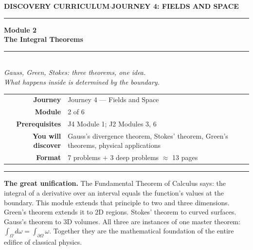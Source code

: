 \documentclass[12pt,a4paper]{article}
\newcounter{problem}
\begin{document}
\thispagestyle{empty}
\begin{center}
{\small\color{MidBlue}\textbf{DISCOVERY CURRICULUM}\quad$\cdot$\quad\textbf{JOURNEY 4: FIELDS AND SPACE}}
\vspace{0.6cm}

{\color{NavyBlue}\rule{\linewidth}{2pt}}\vspace{0.5cm}

{\Huge\bfseries\color{NavyBlue}Module 2}\\[0.3cm]
{\LARGE\bfseries\color{MidBlue}The Integral Theorems}\\[0.4cm]
{\color{Gold}\rule{0.4\linewidth}{1.2pt}}\\[0.4cm]
{\large\itshape\color{DarkGrey}
Gauss, Green, Stokes: three theorems, one idea.\\[0.15cm]
What happens inside is determined by the boundary.}

\vspace{1cm}
\begin{tabular}{rl}
\color{DarkGrey}\textbf{Journey}         & Journey 4 --- Fields and Space \\[4pt]
\color{DarkGrey}\textbf{Module}          & 2 of 6 \\[4pt]
\color{DarkGrey}\textbf{Prerequisites}   & J4 Module 1; J2 Modules 3, 6 \\[4pt]
\color{DarkGrey}\textbf{You will discover} & Gauss's divergence theorem, Stokes' theorem, Green's theorems, physical applications \\[4pt]
\color{DarkGrey}\textbf{Format}          & 7 problems $+$ 3 deep problems $\approx$ 13 pages \\
\end{tabular}
\vspace{1cm}

{\color{NavyBlue}\rule{\linewidth}{2pt}}
\end{center}

\vspace{0.5cm}
\noindent\textbf{The great unification.}
The Fundamental Theorem of Calculus says: the integral of a derivative over an interval equals the function's values at the boundary. This module extends that principle to two and three dimensions. Green's theorem extends it to 2D regions. Stokes' theorem to curved surfaces. Gauss's theorem to 3D volumes. All three are instances of one master theorem: $\int_\Omega d\omega = \int_{\partial\Omega}\omega$. Together they are the mathematical foundation of the entire edifice of classical physics.
\end{document}
